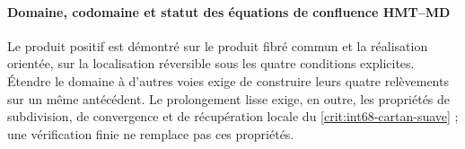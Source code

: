 \paragraph{Domaine, codomaine et statut des équations de confluence HMT–MD}
Le produit positif est démontré sur le produit fibré commun et la
réalisation orientée, sur la localisation réversible sous les quatre
conditions explicites. Étendre le domaine à d'autres voies exige de construire leurs
quatre relèvements sur un même antécédent. Le prolongement lisse exige,
en outre, les propriétés de subdivision, de convergence et de récupération locale du
\cref{crit:int68-cartan-suave} ; une vérification finie ne remplace pas ces
propriétés.
